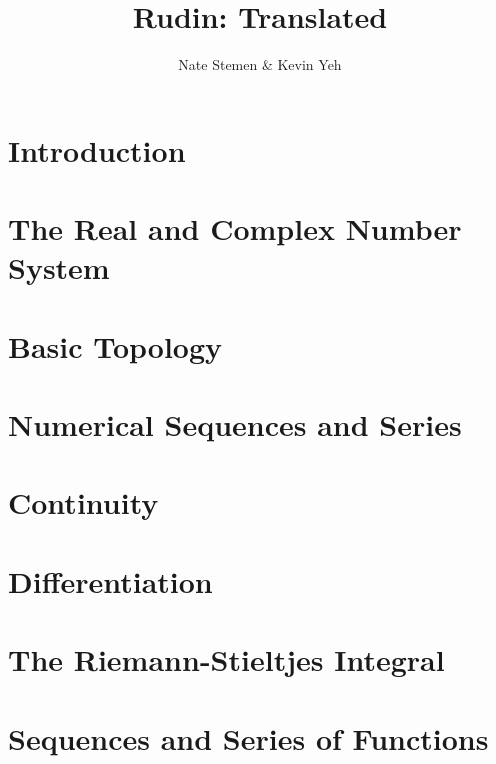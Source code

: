 \documentclass{tufte-book}
\title{Rudin: Translated}
\author{Nate Stemen \& Kevin Yeh}
\begin{document}
\maketitle

\tableofcontents
\setcounter{tocdepth}{10}

\listoftodos

\chapter{Introduction}\label{chap:intro}


\chapter{The Real and Complex Number System}\label{chap:number-systems}


\chapter{Basic Topology}\label{chap:topology}


\chapter{Numerical Sequences and Series}\label{chap:seq-series}


\chapter{Continuity}\label{chap:continuity}


\chapter{Differentiation}\label{chap:differentiation}


\chapter{The Riemann-Stieltjes Integral}\label{chap:integration}


\chapter{Sequences and Series of Functions}\label{chap:seq-series-functions}

\end{document}
